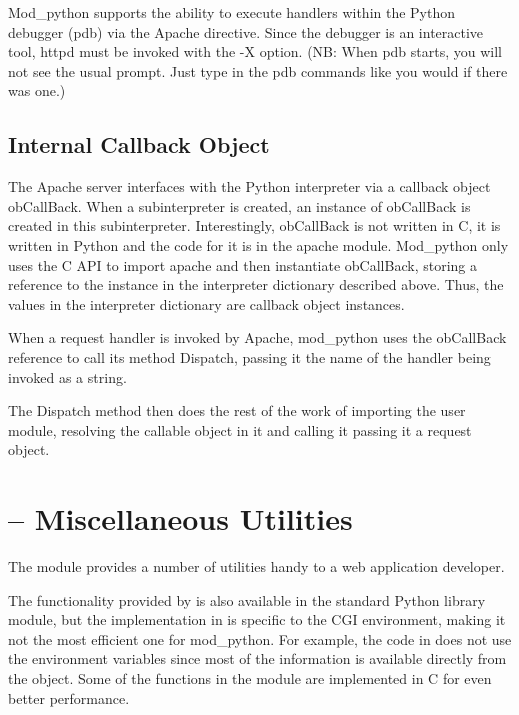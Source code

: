 Mod_python supports the ability to execute handlers within the Python
debugger (pdb) via the  Apache directive. Since
the debugger is an interactive tool, httpd must be invoked with the -X
option. (NB: When pdb starts, you will not see the usual \code{>>>}
prompt. Just type in the pdb commands like you would if there was
one.)

\subsection{Internal Callback Object\label{pyapi-callback}}

The Apache server interfaces with the Python interpreter via a
callback object obCallBack. When a subinterpreter is created, an
instance of obCallBack is created in this
subinterpreter. Interestingly, obCallBack is not written in C, it is
written in Python and the code for it is in the apache module.
Mod_python only uses the C API to import apache and then instantiate
obCallBack, storing a reference to the instance in the interpreter
dictionary described above. Thus, the values in the interpreter
dictionary are callback object instances.

When a request handler is invoked by Apache, mod_python uses the
obCallBack reference to call its method Dispatch, passing it the name
of the handler being invoked as a string.
            
The Dispatch method then does the rest of the work of importing the
user module, resolving the callable object in it and calling it
passing it a request object.

\section{ -- Miscellaneous Utilities\label{pyapi-util}}

The  module provides a number of utilities handy to a 
web application developer. 

The functionality provided by  is also available in the
standard Python library  module, but the
implementation in  is specific to the CGI environment,
making it not the most efficient one for mod_python. For example, the
code in  does not use the environment variables since
most of the information is available directly from the
 object. Some of the functions in the 
module are implemented in C for even better performance.

